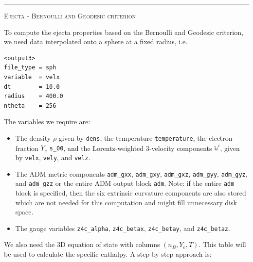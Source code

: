 \documentclass{article}
\newcommand{\var}[1]{%
  {\setlength{\fboxsep}{1.5pt}%
   \colorbox{varbg}{\textcolor{varfg}{\texttt{\small #1}}}}}
\newcommand{\step}[1]{%
  \par\medskip\noindent
  {\color{stepfg}\rule[-0.15ex]{2pt}{1.5ex}\hspace{0.5em}\scshape #1}%
  \hspace{0.75em}\ignorespaces}
\begin{document}
\step{Ejecta - Bernoulli and Geodesic criterion}
To compute the ejecta properties based on the Bernoulli and Geodesic criterion, we need data interpolated onto a sphere
at a fixed radius, i.e.
\begin{verbatim}
<output3>
file_type = sph
variable  = velx
dt        = 10.0
radius    = 400.0
ntheta    = 256
\end{verbatim}
The variables we require are:
\begin{itemize}
  \item The density $\rho$ given by \var{dens}, the temperature \var{temperature}, the electron fraction $Y_e$ \var{s\_00},
  and the Lorentz-weighted 3-velocity components $\tilde{u}^i$, given by \var{velx}, \var{vely}, and \var{velz}.
  \item The ADM metric components \var{adm\_gxx}, \var{adm\_gxy}, \var{adm\_gxz},
  \var{adm\_gyy}, \var{adm\_gyz}, and \var{adm\_gzz} or the entire ADM output block \var{adm}. Note:
  if the entire \var{adm} block is specified, then the six extrinsic curvature components are also
  stored which are not needed for this computation and might fill unnecessary disk space.
  \item The gauge variables \var{z4c\_alpha}, \var{z4c\_betax}, \var{z4c\_betay}, and \var{z4c\_betaz}.
\end{itemize}
We also need the 3D equation of state with columns $(n_B,Y_e,T)$. This table will be used to calculate the specific
enthalpy. A step-by-step approach is:
\end{document}
